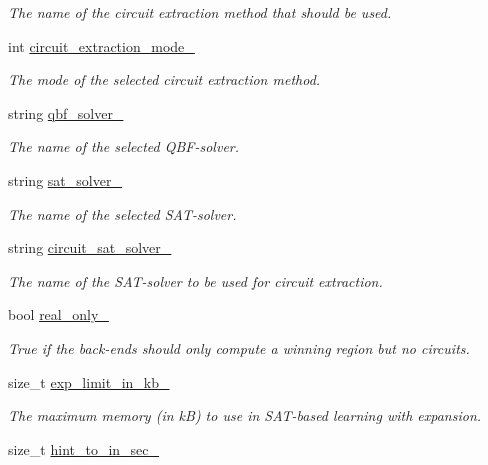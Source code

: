\begin{DoxyCompactItemize}
\begin{DoxyCompactList}\small\item\em The name of the circuit extraction method that should be used. \end{DoxyCompactList}\item 
int \hyperlink{classOptions_a8fc8a1d275e31a687c692ebdcfcef92f}{circuit\-\_\-extraction\-\_\-mode\-\_\-}
\begin{DoxyCompactList}\small\item\em The mode of the selected circuit extraction method. \end{DoxyCompactList}\item 
string \hyperlink{classOptions_a07391a51f78315a8e8d2ecbeb8f57ddd}{qbf\-\_\-solver\-\_\-}
\begin{DoxyCompactList}\small\item\em The name of the selected Q\-B\-F-\/solver. \end{DoxyCompactList}\item 
string \hyperlink{classOptions_af68f26928f23fda3bdc75c4b43ae17bc}{sat\-\_\-solver\-\_\-}
\begin{DoxyCompactList}\small\item\em The name of the selected S\-A\-T-\/solver. \end{DoxyCompactList}\item 
string \hyperlink{classOptions_a1dc174bd99373a624a4643fd44225129}{circuit\-\_\-sat\-\_\-solver\-\_\-}
\begin{DoxyCompactList}\small\item\em The name of the S\-A\-T-\/solver to be used for circuit extraction. \end{DoxyCompactList}\item 
bool \hyperlink{classOptions_a2e3668079f6c62e087edd486d19bf84a}{real\-\_\-only\-\_\-}
\begin{DoxyCompactList}\small\item\em True if the back-\/ends should only compute a winning region but no circuits. \end{DoxyCompactList}\item 
size\-\_\-t \hyperlink{classOptions_a725d5329592e1dba55eb6a446807b3ce}{exp\-\_\-limit\-\_\-in\-\_\-kb\-\_\-}
\begin{DoxyCompactList}\small\item\em The maximum memory (in k\-B) to use in S\-A\-T-\/based learning with expansion. \end{DoxyCompactList}\item 
size\-\_\-t \hyperlink{classOptions_a830786e3337b2fca8d15d02496b25bde}{hint\-\_\-to\-\_\-in\-\_\-sec\-\_\-}

\end{DoxyCompactItemize}

